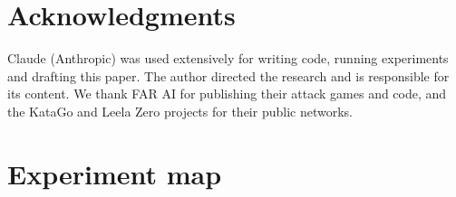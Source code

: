 \documentclass[11pt]{article}
\begin{document}
\section*{Acknowledgments}

Claude (Anthropic) was used extensively for writing code, running experiments and drafting this paper. The author directed the research and is responsible for its content. We thank FAR AI for publishing their attack games and code, and the KataGo and Leela Zero projects for their public networks.




\appendix
\section{Experiment map}
\end{document}
